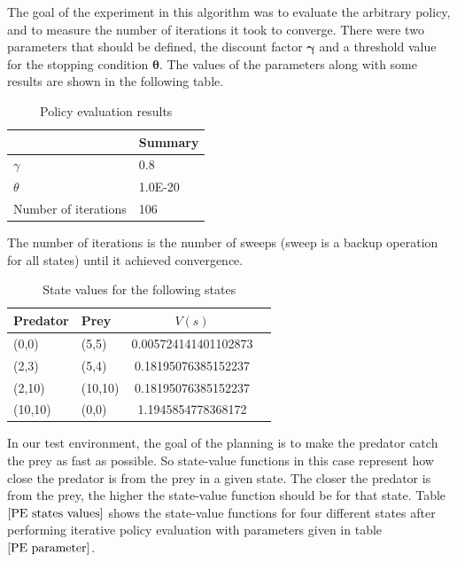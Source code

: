 \documentclass[paper=a4, fontsize=11pt]{scrartcl}
\numberwithin{equation}{section}		%
\numberwithin{figure}{section}			%
\numberwithin{table}{section}				%
\begin{document}
The goal of the experiment in this algorithm was to evaluate the arbitrary policy, and to measure the number of iterations it took to converge. There were two parameters that should be defined, the discount factor $\mathbf{\gamma}$ and a threshold value for the stopping condition $\mathbf{\theta}$. The values of the parameters along with some results are shown in the following table.
\begin{table}[H]
\caption{Policy evaluation results}
\label{PE parameter}
\centering
    \begin{tabular}{| l || l |}
    \hline
      & Summary \\ \hline
    $\gamma$ & 0.8 \\ \hline
    $\theta$ & 1.0E-20 \\ \hline
    Number of iterations & 106 \\
    \hline
    \end{tabular} 
\end{table}
The number of iterations is the number of sweeps (sweep is a backup operation for all states) until it achieved convergence.
\begin{table}[H]
\caption{State values for the following states}
\label{PE states values}
\centering
\begin{tabular}{| l  |  l || c | r |}
  \hline
  Predator & Prey & $V(s)$ \\ \hline
  (0,0) & (5,5) & 0.005724141401102873 \\ \hline
  (2,3) & (5,4) & 0.18195076385152237 \\ \hline
  (2,10) & (10,10) & 0.18195076385152237 \\ \hline
  (10,10) & (0,0) & 1.1945854778368172 \\
  \hline  
\end{tabular}
\end{table}
In our test environment, the goal of the planning is to make the predator catch the prey as fast as possible. So state-value functions in this case represent how close the predator is from the prey in a given state. The closer the predator is from the prey, the higher the state-value function should be for that state. Table $\ref{PE states values}$ shows the state-value functions for four different states after performing iterative policy evaluation with parameters given in table $\ref{PE parameter}$.
\end{document}
